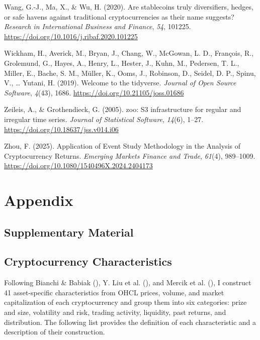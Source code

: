 \documentclass[
  12pt,
  a4paper,
  openany]{scrbook}
\newlength{\cslhangindent}
\newenvironment{CSLReferences}[2] %
 {\begin{list}{}{%
  \setlength{\itemindent}{0pt}
  \setlength{\leftmargin}{0pt}
  \setlength{\parsep}{0pt}
  \ifodd #1
   \setlength{\leftmargin}{\cslhangindent}
   \setlength{\itemindent}{-1\cslhangindent}
  \fi
  \setlength{\itemsep}{#2\baselineskip}}}
 {\end{list}}
\begin{document}
\begin{CSLReferences}{1}{0}
Wang, G.-J., Ma, X., \& Wu, H. (2020). Are stablecoins truly
diversifiers, hedges, or safe havens against traditional
cryptocurrencies as their name suggests? \emph{Research in International
Business and Finance}, \emph{54}, 101225.
\url{https://doi.org/10.1016/j.ribaf.2020.101225}

Wickham, H., Averick, M., Bryan, J., Chang, W., McGowan, L. D.,
François, R., Grolemund, G., Hayes, A., Henry, L., Hester, J., Kuhn, M.,
Pedersen, T. L., Miller, E., Bache, S. M., Müller, K., Ooms, J.,
Robinson, D., Seidel, D. P., Spinu, V., \ldots{} Yutani, H. (2019).
Welcome to the {tidyverse}. \emph{Journal of Open Source Software},
\emph{4}(43), 1686. \url{https://doi.org/10.21105/joss.01686}

Zeileis, A., \& Grothendieck, G. (2005). {zoo}: S3 infrastructure for
regular and irregular time series. \emph{Journal of Statistical
Software}, \emph{14}(6), 1--27.
\url{https://doi.org/10.18637/jss.v014.i06}

Zhou, F. (2025). Application of Event Study Methodology in the Analysis
of Cryptocurrency Returns. \emph{Emerging Markets Finance and Trade},
\emph{61}(4), 989--1009.
\url{https://doi.org/10.1080/1540496X.2024.2404173}

\end{CSLReferences}

\cleardoublepage
{}
{}
\appendix

\chapter{Appendix}\label{appendix}

\section{Supplementary Material}\label{sec-app_material}

\section{Cryptocurrency Characteristics}\label{sec-app_characteristics}

Following Bianchi \& Babiak
(), Y. Liu et
al. (), and Mercik et al.
(),
I construct 41 asset-specific characteristics from OHCL prices, volume,
and market capitalization of each cryptocurrency and group them into six
categories: prize and size, volatility and risk, trading activity,
liquidity, past returns, and distribution. The following list provides
the definition of each characteristic and a description of their
construction.
\end{document}
